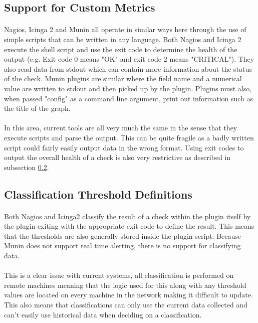 \documentclass[bsc,logo,twoside,singlespacing,notimes]{infthesis}
\begin{document}
\subsection{Support for Custom Metrics}
\paragraph*{}	
	Nagios, Icinga 2 and Munin all operate in similar ways here through the use of
	simple scripts that can be written in any language.  Both Nagios and Icinga 2
	execute the shell script and use the exit code to determine the health of the
	output (e.g. Exit code 0 means "OK" and exit code 2 means "CRITICAL").  They
	also read data from stdout which can contain more information about the status
	of the check.  Munin plugins are similar where the field name and a numerical
	value are written to stdout and then picked up by the plugin.  Plugins must 
	also, when passed "config" as a command line argument, print out information
	such as the title of the graph.
	
\paragraph*{}
	In this area, current tools are all very much the same in the sense that they
	execute scripts and parse the output. This can be quite fragile as a badly
	written script could fairly easily output data in the wrong format. Using exit
	codes to output the overall health of a check is also very restrictive as
	described in subsection \ref{classification-threshold-definitions}.

\subsection{Classification Threshold Definitions}
\label{classification-threshold-definitions}
\paragraph*{}
	Both Nagios and Icinga2 classify the result of a check within the plugin itself
	by the plugin exiting with the appropriate exit code to define the result. This
	means that the thresholds are also generally stored inside the plugin script.
	Because Munin does not support real time alerting, there is no support for
	classifying data.
	
\paragraph*{}
	This is a clear issue with current systems, all classification is performed on
	remote machines meaning that the logic used for this along with any threshold
	values are located on every machine in the network making it difficult to
	update. This also means that classifications can only use the current data
	collected and can't easily use historical data when deciding on a
	classification.
\end{document}
